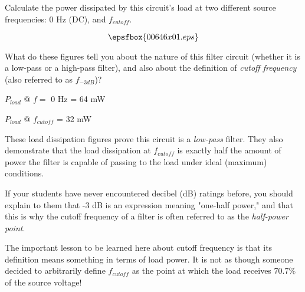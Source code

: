 

Calculate the power dissipated by this circuit's load at two different source frequencies: 0 Hz (DC), and $f_{cutoff}$.

$$\epsfbox{00646x01.eps}$$

What do these figures tell you about the nature of this filter circuit (whether it is a low-pass or a high-pass filter), and also about the definition of {\it cutoff frequency} (also referred to as $f_{-3 dB}$)?







$P_{load}$ @ $f =$ 0 Hz = 64 mW

\vskip 10pt

$P_{load}$ @ $f_{cutoff}$ = 32 mW

\vskip 10pt

These load dissipation figures prove this circuit is a {\it low-pass} filter.  They also demonstrate that the load dissipation at $f_{cutoff}$ is exactly half the amount of power the filter is capable of passing to the load under ideal (maximum) conditions.







If your students have never encountered decibel (dB) ratings before, you should explain to them that -3 dB is an expression meaning "one-half power," and that this is why the cutoff frequency of a filter is often referred to as the {\it half-power point}.  

The important lesson to be learned here about cutoff frequency is that its definition means something in terms of load power.  It is not as though someone decided to arbitrarily define $f_{cutoff}$ as the point at which the load receives 70.7\% of the source voltage!




